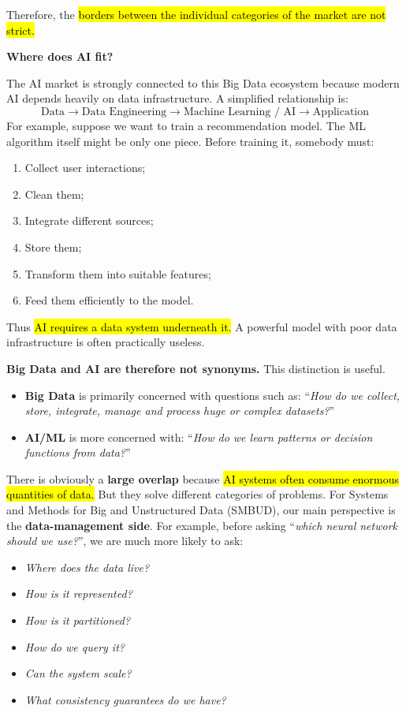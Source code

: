 \highspace
Therefore, the \hl{borders between the individual categories of the market are not strict.}

\highspace
\begin{flushleft}
    \textcolor{Green3}{ \textbf{Where does AI fit?}}
\end{flushleft}
The AI market is strongly connected to this Big Data ecosystem because modern AI depends heavily on data infrastructure. A simplified relationship is:
\begin{equation*}
    \text{Data}
    \rightarrow
    \text{Data Engineering}
    \rightarrow
    \text{Machine Learning / AI}
    \rightarrow
    \text{Application}
\end{equation*}
For example, suppose we want to train a recommendation model. The ML algorithm itself might be only one piece. Before training it, somebody must:
\begin{enumerate}
    \item Collect user interactions;
    \item Clean them;
    \item Integrate different sources;
    \item Store them;
    \item Transform them into suitable features;
    \item Feed them efficiently to the model.
\end{enumerate}
Thus \hl{AI requires a data system underneath it.} A powerful model with poor data infrastructure is often practically useless.

\highspace
\textcolor{Green3}{ \textbf{Big Data and AI are therefore not synonyms.}} This distinction is useful.
\begin{itemize}
    \item \textbf{Big Data} is primarily concerned with questions such as: ``\emph{How do we collect, store, integrate, manage and process huge or complex datasets?}''
    \item \textbf{AI/ML} is more concerned with: ``\emph{How do we learn patterns or decision functions from data?}''
\end{itemize}
There is obviously a \textbf{large overlap} because \hl{AI systems often consume enormous quantities of data.} But they solve different categories of problems. For Systems and Methods for Big and Unstructured Data (SMBUD), our main perspective is the \textbf{data-management side}. For example, before asking ``\emph{which neural network should we use?}'', we are much more likely to ask:
\begin{itemize}
    \item \emph{Where does the data live?}
    \item \emph{How is it represented?}
    \item \emph{How is it partitioned?}
    \item \emph{How do we query it?}
    \item \emph{Can the system scale?}
    \item \emph{What consistency guarantees do we have?}
\end{itemize}

